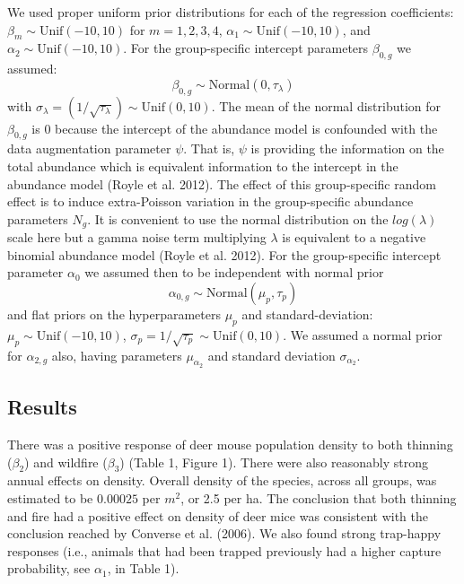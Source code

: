 We used proper uniform prior distributions for each of the regression
coefficients: $\beta_{m} \sim \mbox{Unif}(-10,10)$ for $m=1,2,3,4$,
$\alpha_{1} \sim \mbox{Unif}(-10,10)$, and $\alpha_{2} \sim
\mbox{Unif}(-10,10)$. 
For 
the group-specific intercept parameters $\beta_{0,g}$  we assumed:
\[
\beta_{0,g} \sim \mbox{Normal}(0,\tau_{\lambda})
\]
with 
$\sigma_{\lambda} = (1/\sqrt{\tau_{\lambda}}) \sim
\mbox{Unif}(0,10)$.
The mean of the normal distribution for $\beta_{0,g}$ is 0 because the
intercept of the abundance model is confounded with the data
augmentation parameter $\psi$. That is, $\psi$ is providing the
information on the total abundance which is equivalent information to
the intercept in the abundance model (Royle et al. 2012).  The effect
of this group-specific random effect is to induce extra-Poisson
variation in the group-specific abundance parameters $N_{g}$. It is
convenient to use the normal distribution on the $log(\lambda)$ scale
here but a gamma noise term multiplying $\lambda$ is equivalent to a
negative binomial abundance model (Royle et al. 2012).
 For the group-specific intercept parameter
$\alpha_{0}$ we assumed then to be independent with normal prior
\[
\alpha_{0,g}\sim \mbox{Normal}(\mu_{p},\tau_{p})
\]
and flat priors on the hyperparameters $\mu_{p}$ and
standard-deviation: $\mu_{p} \sim \mbox{Unif}(-10,10)$,
$\sigma_{p}=1/\sqrt{\tau_{p}} \sim \mbox{Unif}(0,10)$.  We assumed a
normal prior for $\alpha_{2,g}$ also, having parameters $\mu_{\alpha_{2}}$
and standard deviation $\sigma_{\alpha_{2}}$.




\subsection{Results}

There was a positive response of deer mouse population density to both
thinning ($\beta_{2}$) and wildfire ($\beta_{3}$) (Table 1, Figure
1). There were also reasonably strong annual effects on
density. Overall density of the species, across all groups, was
estimated to be $0.00025$ per $m^{2}$, or 2.5 per ha. The conclusion
that both thinning and fire had a positive effect on density of
deer mice was consistent with the conclusion reached by Converse et
al. (2006).
We also found strong trap-happy responses (i.e., animals that had been
trapped previously had a higher capture probability, see $\alpha_{1}$,
in Table 1).






